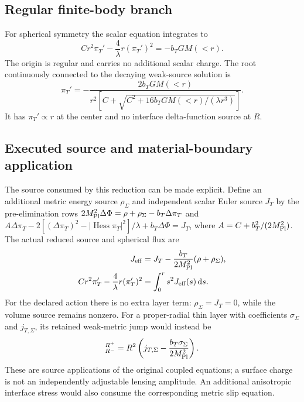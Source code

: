 \subsection{Regular finite-body branch}
For spherical symmetry the scalar equation integrates to
\begin{equation}
 Cr^2\pi_T'-\frac4{\lambda}r(\pi_T')^2=-b_TGM(<r).
 \label{eq:flux}
\end{equation}
The origin is regular and carries no additional scalar charge.
The root continuously connected to the decaying weak-source solution is
\begin{equation}
 \pi_T'=-\frac{2b_TGM(<r)}
 {r^2\left[C+\sqrt{C^2+16b_TGM(<r)/(\lambda r^3)}\right]} .
 \label{eq:root}
\end{equation}
It has $\pi_T'\propto r$ at the center and no interface delta-function
source at $R$.

\subsection{Executed source and material-boundary application}
The source consumed by this reduction can be made explicit. Define an
additional metric energy source $\rho_\Sigma$ and independent scalar
Euler source $J_T$ by the pre-elimination rows
$2M_{\rm Pl}^2\Delta\Phi=\rho+\rho_\Sigma-b_T\Delta\pi_T$ and
$A\Delta\pi_T-2[(\Delta\pi_T)^2-|\operatorname{Hess}\pi_T|^2]/\lambda
+b_T\Delta\Phi=J_T$, where $A=C+b_T^2/(2M_{\rm Pl}^2)$.
The actual reduced source and spherical flux are
\begin{align}
 J_{\rm eff}&=J_T-\frac{b_T}{2M_{\rm Pl}^2}(\rho+\rho_\Sigma),\nonumber\\
 Cr^2\pi_T'-\frac4\lambda r(\pi_T')^2
 &=\int_0^r s^2J_{\rm eff}(s)\,\mathrm d s.
 \label{eq:source-application}
\end{align}
For the declared action there is no extra layer term:
$\rho_\Sigma=J_T=0$, while the volume source remains nonzero.
For a proper-radial thin layer with coefficients $\sigma_\Sigma$ and
$j_{T,\Sigma}$, its retained weak-metric jump would instead be
\begin{equation}
 [Cr^2\pi_T'-4r(\pi_T')^2/\lambda]_{R^-}^{R^+}
 =R^2\left(j_{T,\Sigma}-\frac{b_T\sigma_\Sigma}{2\Mpl^2}\right).
 \label{eq:source-jump}
\end{equation}
These are source applications of the original coupled equations; a
surface charge is not an independently adjustable lensing amplitude.
An additional anisotropic interface stress would also consume the
corresponding metric slip equation.

